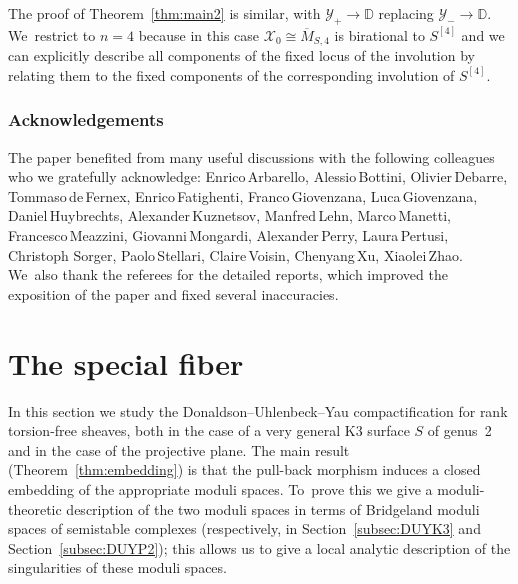 \documentclass[JEP,XML,SOM,Unicode,published]{cedram}
\newcommand{\DD}{{\mathbb D}}
\newcommand\cX{\mathcal{X}}
\newcommand\cY{\mathcal{Y}}
\let\ov\overline
\theoremstyle{definition}
\begin{document}
The proof of Theorem~\ref{thm:main2} is similar, with $\cY_{+}\to\DD$ replacing $\cY_{-}\to\DD$. We~restrict to $n=4$ because in this case $\cX_0\cong \ov{M}_{S,4}$ is birational to $S^{[4]}$ and we can explicitly describe all components of the fixed locus of the involution by relating them to the fixed components of the corresponding involution of $S^{[4]}$.

\subsubsection*{Acknowledgements}
The paper benefited from many useful discussions with the following colleagues who we gratefully acknowledge: Enrico\,Arbarello, Alessio\,\hbox{Bottini}, Olivier\,Debarre, Tommaso\,de\,Fernex, Enrico\,Fatighenti, Franco\,Giovenzana, Luca\,Gio\-ven\-zana, Daniel\,Huybrechts, Alexander\,Kuznetsov, Manfred\,Lehn, Marco\,Manetti, Francesco\,Meazzini, Giovanni\,Mongardi, Alexander\,Perry, Laura\,Pertusi, Christoph Sorger, Paolo\,Stellari, Claire\,Voisin, Chenyang\,Xu, Xiaolei\,Zhao. We~also thank the referees for the detailed reports, which improved the exposition of the paper and fixed several inaccuracies.

\section{The special fiber}\label{sec:SpecialFiber}

In this section we study the Donaldson--Uhlenbeck--Yau compactification for rank torsion-free sheaves, both in the case of a very general K3 surface $S$ of genus~2 and in the case of the projective plane. The main result (Theorem~\ref{thm:embedding}) is that the pull-back morphism induces a closed embedding of the appropriate moduli spaces. To~prove this we give a moduli-theoretic description of the two moduli spaces in terms of Bridgeland moduli spaces of semistable complexes (respectively, in Section~\ref{subsec:DUYK3} and Section~\ref{subsec:DUYP2}); this allows us to give a local analytic description of the singularities of these moduli spaces.

\label{subsec:DUYK3}
\end{document}

